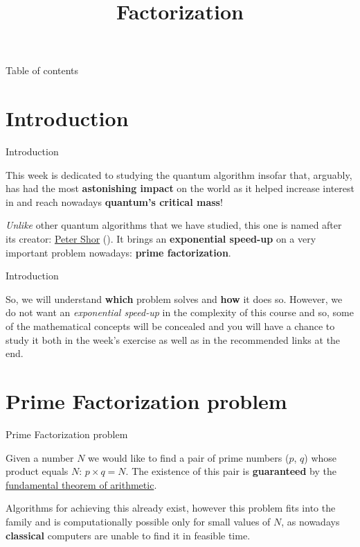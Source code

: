\documentclass[aspectratio=43]{beamer}
\title{\q Factorization}
\begin{document}
\begin{frame}
	\titlepage
\end{frame}


\begin{frame}{Table of contents}
	\begin{card}
		\tableofcontents
	\end{card}
\end{frame}


\section{Introduction}
\begin{frame}{Introduction}
    \begin{card}
        This week is dedicated to studying the quantum algorithm insofar that, arguably, has had the most \textbf{astonishing impact} on the world as it helped increase interest in \qc and reach nowadays \textbf{quantum's critical mass}!
    \end{card}
    \begin{card}
        \textit{Unlike} other quantum algorithms that we have studied, this one is named after its creator: \href{https://en.wikipedia.org/wiki/Peter_Shor}{Peter Shor} (\textbf{\sa}). It brings an \textbf{exponential speed-up} on a very important problem nowadays: \textbf{prime factorization}.
    \end{card}
\pagenumber
\end{frame}
\begin{frame}{Introduction}
    \begin{card}
        So, we will understand \textbf{which} problem \sa solves and \textbf{how} it does so. However, we do not want an \textit{exponential speed-up} in the complexity of this course and so, some of the mathematical concepts will be concealed and you will have a chance to study it both in the week's exercise as well as in the recommended links at the end.
    \end{card}
\pagenumber
\end{frame}


\section{Prime Factorization problem}
\begin{frame}{Prime Factorization problem}
    \begin{card}
        Given a number $N$ we would like to find a pair of prime numbers ($p$, $q$) whose product equals $N$: $p\times q=N$. The existence of this pair is \textbf{guaranteed} by the \href{https://en.wikipedia.org/wiki/Fundamental_theorem_of_arithmetic}{fundamental theorem of arithmetic}.
    \end{card}
    \begin{card}
        Algorithms for achieving this already exist, however this problem fits into the \np family and is computationally possible only for small values of $N$, as nowadays \textbf{classical} computers are unable to find it in feasible time.
    \end{card}
\pagenumber
\end{frame}
\end{document}
